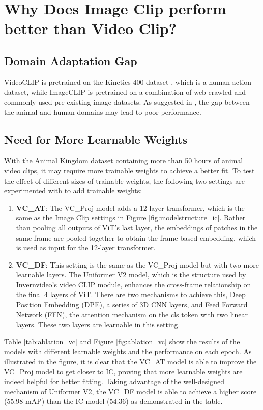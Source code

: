 \section{Why Does Image Clip perform better than Video Clip?}
\label{sec:discussion_vc}
\subsection{Domain Adaptation Gap}
VideoCLIP is pretrained on the Kinetics-400 dataset \parencite{kay2017kinetics}, which is a human action dataset, while ImageCLIP is pretrained on a combination of web-crawled and commonly used pre-existing image datasets. As suggested in \parencite{farahani2021brief}, the gap between the animal and human domains may lead to poor performance.

\subsection{Need for More Learnable Weights}
With the Animal Kingdom dataset containing more than 50 hours of animal video clips, it may require more trainable weights to achieve a better fit. To test the effect of different sizes of trainable weights, the following two settings are experimented with to add trainable weights:

\begin{enumerate}
    \item \textbf{VC\_AT}: The VC\_Proj model adds a 12-layer transformer, which is the same as the Image Clip settings in Figure \ref{fig:modelstructure_ic}. Rather than pooling all outputs of ViT's last layer, the embeddings of patches in the same frame are pooled together to obtain the frame-based embedding, which is used as input for the 12-layer transformer.
    \item \textbf{VC\_DF}: This setting is the same as the VC\_Proj model but with two more learnable layers. The Uniformer V2 model, which is the structure used by Invernvideo's video CLIP module, enhances the cross-frame relationship on the final 4 layers of ViT. There are two mechanisms to achieve this, Deep Position Embedding (DPE), a series of 3D CNN layers, and Feed Forward Network (FFN), the attention mechanism on the cls token with two linear layers. These two layers are learnable in this setting.
\end{enumerate}

Table \ref{tab:ablation_vc} and Figure \ref{fig:ablation_vc} show the results of the models with different learnable weights and the performance on each epoch. As illustrated in the figure, it is clear that the VC\_AT model is able to improve the VC\_Proj model to get closer to IC, proving that more learnable weights are indeed helpful for better fitting. Taking advantage of the well-designed mechanism of Uniformer V2, the VC\_DF model is able to achieve a higher score (55.98 mAP) than the IC model (54.36) as demonstrated in the table. 

